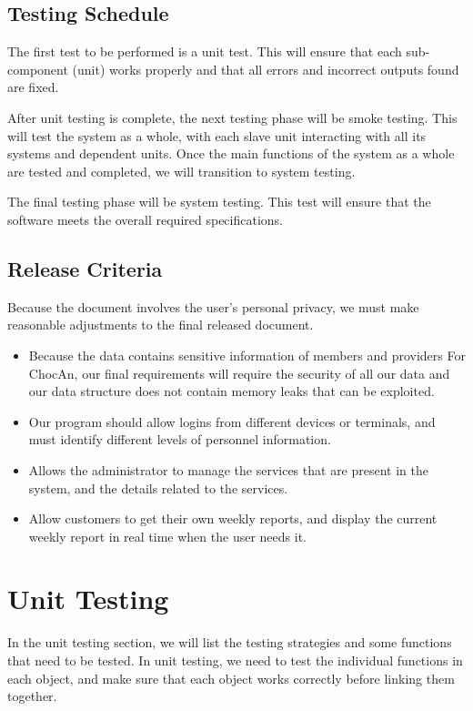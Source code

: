 \documentclass{article}
\begin{document}
\subsection{Testing Schedule}
The first test to be performed is a unit test. This will ensure that each sub-
component (unit) works properly and that all errors and incorrect outputs
found are fixed.

After unit testing is complete, the next testing phase will be smoke
testing. This will test the system as a whole, with each slave unit
interacting with all its systems and dependent units. Once the main
functions of the system as a whole are tested and completed, we will
transition to system testing.

The final testing phase will be system testing. This test will ensure that
the software meets the overall required specifications.

\subsection{Release Criteria}
Because the document involves the user's personal privacy, we must make
reasonable adjustments to the final released document.
\begin{itemize}
   \item Because the data contains sensitive information of members and
      providers For ChocAn, our final requirements will require the security of all
      our data and our data structure does not contain memory leaks that can
      be exploited.
   \item Our program should allow logins from different devices or terminals, and
      must identify different levels of personnel information.
   \item Allows the administrator to manage the services that are present in the
      system, and the details related to the services.
   \item Allow customers to get their own weekly reports, and display the current
      weekly report in real time when the user needs it.
\end{itemize}


\section{Unit Testing}
In the unit testing section, we will list the testing strategies and some functions
that need to be tested. In unit testing, we need to test the individual functions in
each object, and make sure that each object works correctly before linking them
together.
\end{document}
